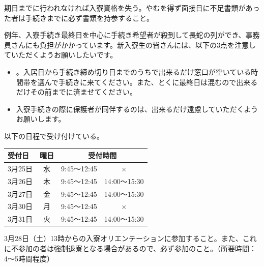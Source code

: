 \newpage 
{}
		期日までに行われなければ入寮資格を失う。やむを得ず面接日に不足書類があった者は手続きまでに必ず書類を持参すること。
		
		例年、入寮手続き最終日を中心に手続き希望者が殺到して長蛇の列ができ、事務員さんにも負担がかかっています。新入寮生の皆さんには、以下の3点を注意していただくようお願いしたいです。
		\begin{itemize}
		    \item {}。入居日から手続き締め切り日までのうちで出来るだけ窓口が空いている時間帯を選んで手続きに来てください。また、とくに最終日は混むので出来るだけその前までに済ませてください。
		    \item 入寮手続きの際に保護者が同伴するのは、出来るだけ遠慮していただくようお願いします。
		\end{itemize}
        
  以下の日程で受け付けている。
\begin{table}[h]
  \begin{tabular}{|l|c|c|c|}
    \hline
    受付日 & 曜日  & \multicolumn{2}{|c|}{受付時間}                  \\ \hline \hline
    
    3月25日 & 水 & 9:45〜12:45 & $ \times $\\ \hline
    3月26日 & 木 & 9:45〜12:45 & 14:00〜15:30\\ \hline
    3月27日 & 金 & 9:45〜12:45 & 14:00〜15:30\\ \hline
    3月30日 & 月 & 9:45〜12:45 & $ \times $\\ \hline
    3月31日 & 火 & 9:45〜12:45 & 14:00〜15:30\\ \hline
     \hline
  \end{tabular}
\end{table}

	3月28日（土）13時からの入寮オリエンテーションに参加すること。また、これに不参加の者は強制退寮となる場合があるので、必ず参加のこと。（所要時間：4〜5時間程度）


